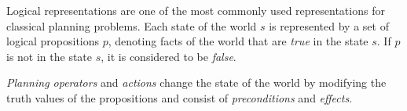 

Logical representations are one of the most commonly used representations for classical planning problems. 
Each state of the world $s$ is represented by a set of logical propositions $p$, denoting facts of the world that are \textit{true} in the state $s$. 
If $p$ is not in the state $s$, it is considered to be \textit{false}.

\textit{Planning operators} and \textit{actions} change the state of the world by modifying the truth values of the propositions and consist of \textit{preconditions} and \textit{effects}.

